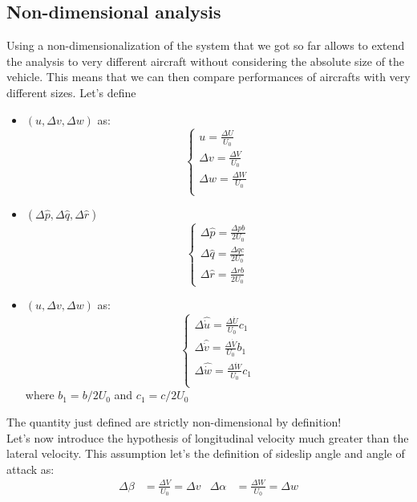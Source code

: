 \subsection{Non-dimensional analysis}
Using a non-dimensionalization of the system that we got so far allows to extend the analysis to very different aircraft without considering the absolute size of the vehicle. This means that we can then compare performances of aircrafts with very different sizes. 
Let's define
\begin{itemize}
    \item $(u,\Delta v, \Delta w)$ as:
    \begin{equation}
        \begin{cases}
                   u = \frac{\Delta U}{U_0}\\ 
            \Delta v = \frac{\Delta V}{U_0}\\ 
            \Delta w = \frac{\Delta W}{U_0}\\ 
        \end{cases} 
    \end{equation}
    \item $(\Delta \hat{p},\Delta \hat{q},\Delta \hat{r})$
    \begin{equation}
        \begin{cases}
            \Delta \hat{p} = \frac{\Delta pb}{2U_0}\\
            \Delta \hat{q} = \frac{\Delta qc}{2U_0}\\
            \Delta \hat{r} = \frac{\Delta rb}{2U_0}
        \end{cases}
    \end{equation}
    \item $(u,\Delta v, \Delta w)$ as:
    \begin{equation}
        \begin{cases}
            \Delta \hat{\dot u} = \frac{\Delta \dot U}{U_0} c_1\\
            \Delta \hat{\dot v} = \frac{\Delta \dot V}{U_0} b_1\\
            \Delta \hat{\dot w} = \frac{\Delta \dot W}{U_0} c_1\\
        \end{cases} 
    \end{equation}
    where $b_1 = b/2U_0$ and $c_1 = c/2U_0$  
\end{itemize}
The quantity just defined are strictly non-dimensional by definition!
\\
Let's now introduce the hypothesis of longitudinal velocity much greater than the lateral velocity. This assumption let's the definition of sideslip angle and angle of attack as:
\begin{align}
    \Delta \beta & = \frac{\Delta V}{U_0} = \Delta v & \Delta \alpha & = \frac{\Delta W}{U_0} = \Delta w
\end{align}

